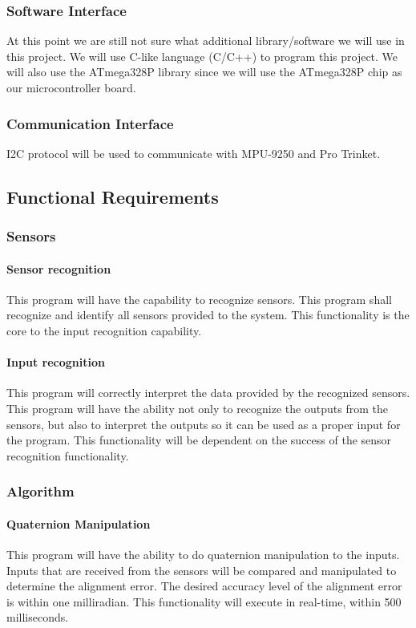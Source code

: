 \subsubsection{Software Interface}
At this point we are still not sure what additional library/software we will use in this project. We will use C-like language (C/C++) to program this project. We will also use the ATmega328P library since we will use the ATmega328P chip as our microcontroller board.
\\
\subsubsection{Communication Interface}
I2C protocol will be used to communicate with MPU-9250 and Pro Trinket. 


\subsection{Functional Requirements}
\subsubsection{Sensors}

\paragraph{Sensor recognition}
This program will have the capability to recognize sensors. This program shall recognize and identify all sensors provided to the system. This functionality is the core to the input recognition capability.
\\
\paragraph{Input recognition}
This program will correctly interpret the data provided by the recognized sensors. This program will have the ability not only to recognize the outputs from the sensors, but also to interpret the outputs so it can be used as a proper input for the program. This functionality will be dependent on the success of the sensor recognition functionality.
\\
\subsubsection{Algorithm}
\paragraph{Quaternion Manipulation}
This program will have the ability to do quaternion manipulation to the inputs. Inputs that are received from the sensors will be compared and manipulated to determine the alignment error. The desired accuracy level of the alignment error is within one milliradian. This functionality will execute in real-time, within 500 milliseconds.
\\
